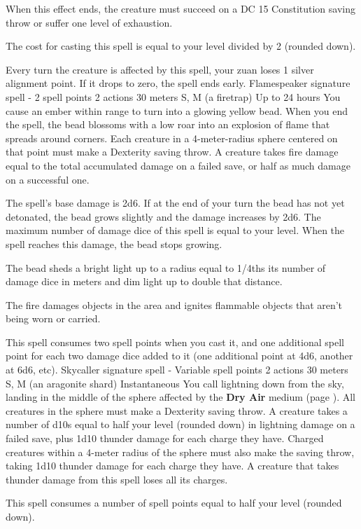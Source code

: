    When this effect ends, the creature must succeed on a DC 15 Constitution saving throw or suffer one level of exhaustion.

    The cost for casting this spell is equal to your level divided by 2 (rounded down).

    Every turn the creature is affected by this spell, your zuan loses 1 silver alignment point.
    If it drops to zero, the spell ends early.
    {Flamespeaker signature spell - 2 spell points}
    {2 actions}
    {30 meters}
    {S, M (a firetrap)}
    {Up to 24 hours}
    You cause an ember within range to turn into a glowing yellow bead.
    When you end the spell, the bead blossoms with a low roar into an explosion of flame that spreads around corners.
    Each creature in a 4-meter-radius sphere centered on that point must make a Dexterity saving throw.
    A creature takes fire damage equal to the total accumulated damage on a failed save, or half as much damage on a successful one.

    The spell's base damage is 2d6.
    If at the end of your turn the bead has not yet detonated, the bead grows slightly and the damage increases by 2d6.
    The maximum number of damage dice of this spell is equal to your level.
    When the spell reaches this damage, the bead stops growing.

    The bead sheds a bright light up to a radius equal to 1/4ths its number of damage dice in meters and dim light up to double that distance.

    The fire damages objects in the area and ignites flammable objects that aren't being worn or carried.

    This spell consumes two spell points when you cast it, and one additional spell point for each two damage dice added to it (one additional point at 4d6, another at 6d6, etc).
    {Skycaller signature spell - Variable spell points}
    {2 actions}
    {30 meters}
    {S, M (an aragonite shard)}
    {Instantaneous}
    You call lightning down from the sky, landing in the middle of the sphere affected by the \textbf{Dry Air} medium (page \pageref{medium::dryair}).
    All creatures in the sphere must make a Dexterity saving throw.
    A creature takes a number of d10s equal to half your level (rounded down) in lightning damage on a failed save, plus 1d10 thunder damage for each charge they have.
    Charged creatures within a 4-meter radius of the sphere must also make the saving throw, taking 1d10 thunder damage for each charge they have.
    A creature that takes thunder damage from this spell loses all its charges.

    This spell consumes a number of spell points equal to half your level (rounded down).
